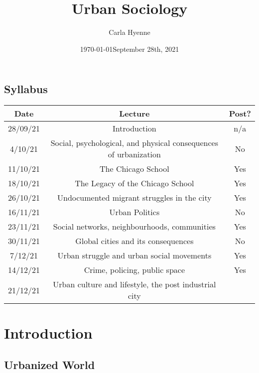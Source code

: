 \documentclass{article}
\title{Urban Sociology}
\author{Carla Hyenne }
\date{\today}
\begin{document}
\maketitle

\tableofcontents

\subsection{Syllabus}

\begin{tabular}{|c|c|c|}
	\hline
	Date & Lecture & Post? \\ 
	 \hline
	28/09/21 & Introduction & n/a  \\  
	 \hline
	4/10/21 & Social, psychological, and physical consequences of urbanization & No \\   
	 \hline
	 11/10/21 & The Chicago School & Yes \\
	 \hline
	 18/10/21 & The Legacy of the Chicago School & Yes \\   
	 \hline
	 26/10/21 & Undocumented migrant struggles in the city & Yes  \\   
	  \hline
	 16/11/21 & Urban Politics &  No \\   
	 \hline
	 23/11/21 & Social networks, neighbourhoods, communities & Yes  \\   
	 \hline
	 30/11/21 & Global cities and its consequences & No  \\   
	  \hline
	 7/12/21 & Urban struggle and urban social movements & Yes  \\   
	 \hline
	 14/12/21 & Crime, policing, public space &  Yes \\   
	 \hline
	 21/12/21 & Urban culture and lifestyle, the post industrial city &  \\ 
	 \hline
\end{tabular}

\pagebreak


\section{Introduction}
\date{September 28th, 2021}

\subsection{Urbanized World}
\end{document}
